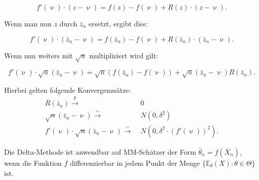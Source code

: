 \documentclass[10pt]{article}
\newcommand{\EW}{\mathbb{E}} %
\newcommand{\KW}{\overset{p} \longrightarrow} %
\newcommand{\KV}{\overset{\sim} \longrightarrow} %
\newenvironment{BWS}[1][]
{\begin{Beweis}[frametitle=#1]}{\end{Beweis}}
\begin{document}
\begin{BWS}[Beweis 1.3.1 Delta-Methode]
		\begin{equation*}
			f'(\upnu) \cdot (z-\upnu) = f(z) - f(\upnu) + R(z) \cdot (z-\upnu).
		\end{equation*}
		
		Wenn man nun $z$ durch $\bar{z}_n$ ersetzt, ergibt dies:
		
		
		\begin{equation*}
			f'(\upnu) \cdot (\bar{z}_n-\upnu) = f(\bar{z}_n) - f(\upnu) + R(\bar{z}_n) \cdot (\bar{z}_n-\upnu).			
		\end{equation*}
		
		Wenn nun weiters mit $\sqrt{n}$ multipliziert wird gilt:
		
		\begin{equation*}
			f'(\upnu) \cdot\sqrt{n} (\bar{z}_n-\upnu) = \sqrt{n}(f(\bar{z}_n) - f(\upnu)) + \sqrt{n} (\bar{z}_n-\upnu)	R(\bar{z}_n).
		\end{equation*}
		
		Hierbei gelten folgende Konvergenzsätze:
		\begin{equation*}
			\begin{split}
			R(\bar{z}_n) \KW& \;0\\
			\sqrt{n} (\bar{z}_n-\upnu) \KV& \;N(0,\delta^2)\\
			f'(\upnu) \cdot\sqrt{n} (\bar{z}_n-\upnu) \KV& \;N(0,\delta^2 \cdot (f'(\upnu))^2).
			\end{split}
		\end{equation*}
		
		
	\end{BWS}
	
	\noindent Die Delta-Methode ist anwendbar auf MM-Schätzer der Form $\hat{\theta}_n = f(\bar{X}_n)$, wenn die Funktion $f$ differenzierbar in jedem Punkt der Menge $\{\EW_\theta(X) : \theta \in \Theta\}$ ist.
	
	
	
\end{document}
